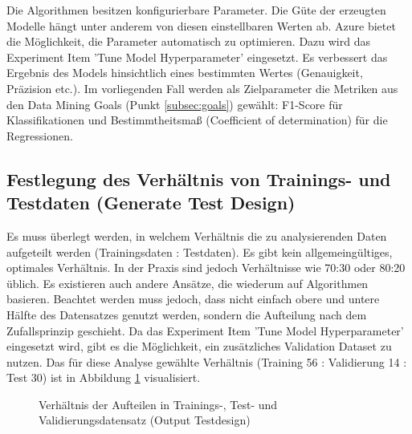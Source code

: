 Die Algorithmen besitzen konfigurierbare Parameter. Die Güte der erzeugten Modelle hängt unter anderem von diesen einstellbaren Werten ab. Azure bietet die Möglichkeit, die Parameter automatisch zu optimieren. Dazu wird das Experiment Item 'Tune Model Hyperparameter' eingesetzt. Es verbessert das Ergebnis des Models hinsichtlich eines bestimmten Wertes (Genauigkeit, Präzision etc.). Im vorliegenden Fall werden als Zielparameter die Metriken aus den Data Mining Goals (Punkt \ref{subsec:goals}) gewählt:
F1-Score für Klassifikationen und Bestimmtheitsmaß (Coefficient of determination) für die Regressionen.

\subsection{Festlegung des Verhältnis von Trainings- und Testdaten (Generate Test Design)}
Es muss überlegt werden, in welchem Verhältnis die zu analysierenden Daten aufgeteilt werden (Trainingsdaten : Testdaten). Es gibt kein allgemeingültiges, optimales Verhältnis. In der Praxis sind jedoch Verhältnisse wie 70:30 oder 80:20 üblich. Es existieren auch andere Ansätze, die wiederum auf Algorithmen basieren.\citep{crowther_method_2005} Beachtet werden muss jedoch, dass nicht einfach obere und untere Hälfte des Datensatzes genutzt werden, sondern die Aufteilung nach dem Zufallsprinzip geschieht. Da das Experiment Item 'Tune Model Hyperparameter' eingesetzt wird, gibt es die Möglichkeit, ein zusätzliches Validation Dataset zu nutzen. Das für diese Analyse gewählte Verhältnis (Training 56 : Validierung 14 : Test 30) ist in Abbildung \ref{fig:ratio} visualisiert.
\begin{figure}[H]
\centering
{}
\caption{Verhältnis der Aufteilen in Trainings-, Test- und Validierungsdatensatz (Output Testdesign)}
\label{fig:ratio}
\end{figure}

